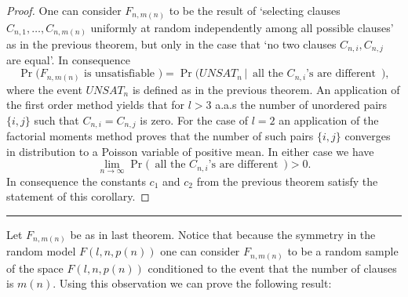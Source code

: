 \documentclass[12pt,notitlepage,a4paper]{article}
\theoremstyle{definition}
\newcommand{\Ln}{\lim\limits_{n\to \infty}}
\newcommand{\sep}{\noindent\rule{2cm}{0.4pt}}
\begin{document}
\begin{proof}
One can consider $F_{n,m(n)}$ to be the result of `selecting clauses $C_{n,1},\dots, C_{n,m(n)}$
uniformly at random independently among all possible clauses' as in the previous theorem, but only in the case that `no two clauses $C_{n,i}, C_{n,j}$ are equal'. In consequence 
\[
\Pr \big( F_{n,m(n)} \text{ is unsatisfiable } \big) 
=
\Pr \big(UNSAT_n \, \big| \, \text{ all the $C_{n,i}$'s are different }\,\big),
\] 
where the event $UNSAT_n$ is defined as in the previous theorem. An application of the first
order method yields that for $l>3$ a.a.s the number of unordered pairs $\{i,j\}$ such that
$C_{n,i}=C_{n,j}$ is zero. For the case of $l=2$ an application of the factorial moments
method proves that the number of such pairs $\{i,j\}$ converges in distribution to 
a Poisson variable of positive mean. In either case we have
\[
\Ln \Pr \big(\, \text{ all the $C_{n,i}$'s are different }\,\big)>0.
\]
In consequence the constants $c_1$ and $c_2$ from the previous theorem satisfy
the statement of this corollary. 
\end{proof}
\sep


Let $F_{n,m(n)}$ be as in last theorem. Notice that because the symmetry in 
the random model $F(l,n,p(n))$ one can consider $F_{n,m(n)}$ to be a random
sample of the space $F(l,n,p(n))$ conditioned to the event that the number of clauses
is $m(n)$. Using this observation we can prove the following result:
  
\end{document}

